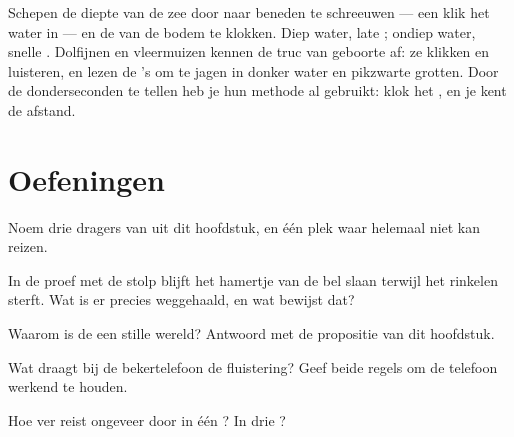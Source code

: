 \begin{remark}\label{rem:g4:how-sound-travels:sonar}
Schepen  de diepte van de zee door naar beneden te schreeuwen ---
een klik het water in --- en de  van de bodem te klokken. Diep
water, late ; ondiep water, snelle . Dolfijnen en vleermuizen
kennen de truc van geboorte af: ze klikken en luisteren, en lezen de
's om te jagen in donker water en pikzwarte grotten. Door de
donderseconden te tellen heb je hun methode al gebruikt: klok het
, en je kent de afstand.
\end{remark}

\section{Oefeningen}

\begin{exercise}[$\star$]\label{exo:g4:how-sound-travels:1}
Noem drie dragers van  uit dit hoofdstuk, en één plek waar
 helemaal niet kan reizen.
\end{exercise}

\begin{exercise}[$\star$]\label{exo:g4:how-sound-travels:2}
In de proef met de stolp blijft het hamertje van de bel slaan terwijl
het rinkelen sterft. Wat is er precies weggehaald, en wat bewijst dat?
\end{exercise}

\begin{exercise}[$\star$]\label{exo:g4:how-sound-travels:3}
Waarom is de  een stille wereld? Antwoord met de propositie van
dit hoofdstuk.
\end{exercise}

\begin{exercise}[$\star$]\label{exo:g4:how-sound-travels:4}
Wat draagt bij de bekertelefoon de fluistering? Geef beide regels om
de telefoon werkend te houden.
\end{exercise}

\begin{exercise}[$\star$]\label{exo:g4:how-sound-travels:5}
Hoe ver reist  ongeveer door  in één ? In drie
?
\end{exercise}

